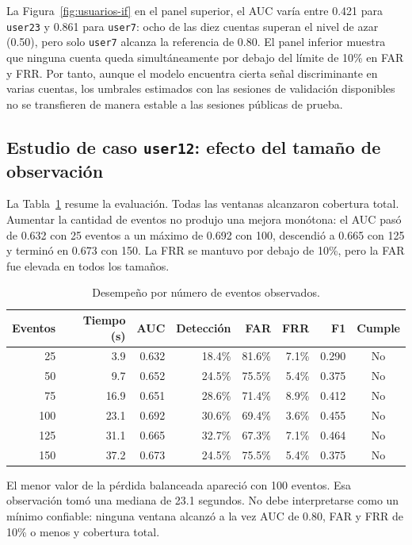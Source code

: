 \documentclass[11pt,letterpaper]{article}
\begin{document}
La Figura~\ref{fig:usuarios-if}  en el panel superior, el AUC varía
entre 0.421 para \texttt{user23} y 0.861 para \texttt{user7}: ocho de las diez cuentas superan el nivel de azar
(0.50), pero solo \texttt{user7} alcanza la referencia de 0.80. El panel inferior muestra que ninguna cuenta queda
simultáneamente por debajo del límite de 10\% en FAR y FRR. Por tanto, aunque el modelo encuentra cierta señal
discriminante en varias cuentas, los umbrales estimados con las sesiones de validación disponibles no se transfieren
de manera estable a las sesiones públicas de prueba.

\subsection{Estudio de caso \texttt{user12}: efecto del tamaño de observación}

La Tabla~\ref{tab:ventanas} resume la evaluación. Todas las ventanas alcanzaron cobertura total. Aumentar la
cantidad de eventos no produjo una mejora monótona: el AUC pasó de 0.632 con 25 eventos a un máximo de 0.692 con
100, descendió a 0.665 con 125 y terminó en 0.673 con 150. La FRR se mantuvo por debajo de 10\%, pero la FAR fue
elevada en todos los tamaños.

\begin{table}[htbp]
  \centering
  \small
  \begin{tabular}{rrrrrrrc}
    \toprule
    Eventos & Tiempo (s) & AUC & Detección & FAR & FRR & F1 & Cumple \\
    \midrule
    25  & 3.9  & 0.632 & 18.4\% & 81.6\% & 7.1\% & 0.290 & No \\
    50  & 9.7  & 0.652 & 24.5\% & 75.5\% & 5.4\% & 0.375 & No \\
    75  & 16.9 & 0.651 & 28.6\% & 71.4\% & 8.9\% & 0.412 & No \\
    100 & 23.1 & 0.692 & 30.6\% & 69.4\% & 3.6\% & 0.455 & No \\
    125 & 31.1 & 0.665 & 32.7\% & 67.3\% & 7.1\% & 0.464 & No \\
    150 & 37.2 & 0.673 & 24.5\% & 75.5\% & 5.4\% & 0.375 & No \\
    \bottomrule
  \end{tabular}
  \caption{Desempeño por número de eventos observados.}
  \label{tab:ventanas}
\end{table}

El menor valor de la pérdida balanceada apareció con 100 eventos. Esa observación tomó una mediana de 23.1 segundos.
No debe interpretarse como un mínimo confiable: ninguna ventana alcanzó a la vez AUC de 0.80, FAR y FRR de 10\% o
menos y cobertura total.
\end{document}
